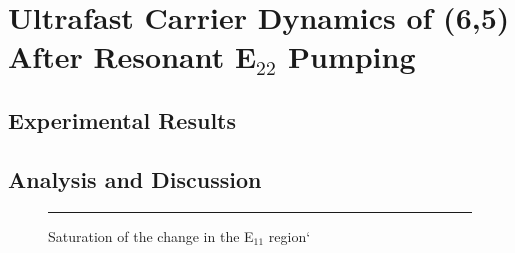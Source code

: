 \chapter{Ultrafast Carrier Dynamics of (6,5) After Resonant E$_{22}$ Pumping}

\section{Experimental Results}


\section{Analysis and Discussion}


\begin{figure}[h]
	\centering
	\rule{10cm}{6cm}
	\caption{Saturation of the change in the E$_{11}$ region`}
\end{figure}
